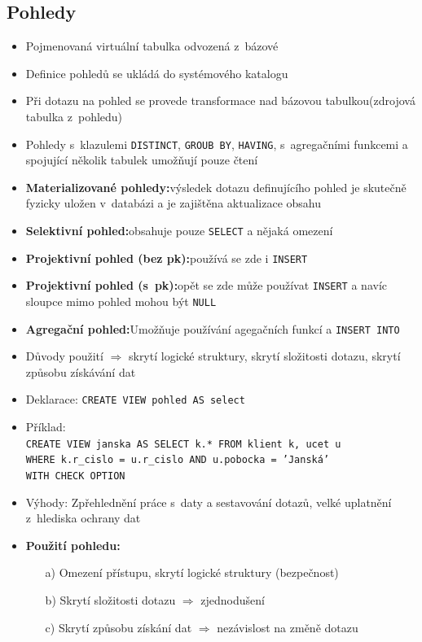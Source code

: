 \documentclass[a4paper,10pt]{article}
\newcommand{\pojem}[2]{\item \textbf{#1:}\quad #2}
\newcommand{\tedy}{$\Rightarrow$ }
\begin{document}
    \subsection{Pohledy}
      \begin{itemize}
        \item Pojmenovaná virtuální tabulka odvozená z~bázové
        \item Definice pohledů se ukládá do systémového katalogu
        \item Při dotazu na pohled se provede transformace nad bázovou tabulkou(zdrojová tabulka z~pohledu)
        \item Pohledy s~klazulemi \texttt{DISTINCT}, \texttt{GROUB BY}, \texttt{HAVING}, s~agregačními funkcemi a spojující několik tabulek umožňují pouze čtení

        \pojem{Materializované pohledy}{výsledek dotazu definujícího pohled je skutečně fyzicky uložen v~databázi a je zajištěna aktualizace obsahu}
        \pojem{Selektivní pohled}{obsahuje pouze \texttt{SELECT} a nějaká omezení}
        \pojem{Projektivní pohled (bez pk)}{používá se zde i \texttt{INSERT}}
        \pojem{Projektivní pohled (s~pk)}{opět se zde může používat \texttt{INSERT} a navíc sloupce mimo pohled mohou být \texttt{NULL}}
        \pojem{Agregační pohled}{Umožňuje  používání agegačních funkcí a \texttt{INSERT INTO}}

        \item Důvody použití \tedy skrytí logické struktury, skrytí složitosti dotazu, skrytí způsobu získávání dat
        \item Deklarace: \texttt{CREATE VIEW pohled AS select}
        \item Příklad: \\ \texttt{CREATE VIEW janska AS SELECT k.* FROM klient k, ucet u} \\
          \texttt{WHERE k.r\_cislo = u.r\_cislo AND u.pobocka = 'Janská'} \\
          \texttt{WITH CHECK OPTION} \\
        \item Výhody: Zpřehlednění práce s~daty a sestavování dotazů, velké uplatnění z~hlediska ochrany dat
        \pojem{Použití pohledu}
        \begin{itemize}
          \item[a)] Omezení přístupu, skrytí logické struktury (bezpečnost)
          \item[b)] Skrytí složitosti dotazu \tedy zjednodušení
          \item[c)] Skrytí způsobu získání dat \tedy nezávislost na změně dotazu
        \end{itemize}
      \end{itemize}
\end{document}
